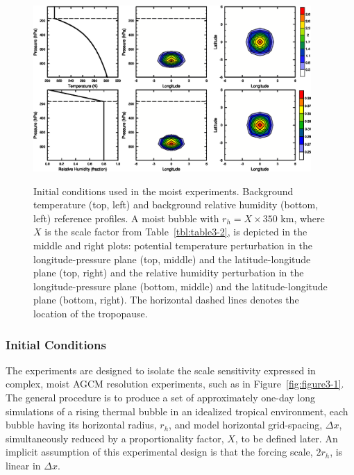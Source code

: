 \begin{figure}
\begin{center}
\noindent\includegraphics[width=25pc,angle=0]{chapter3/Figure2.eps}\\
\end{center}
\caption{Initial conditions used in the moist experiments. Background temperature (top, left) and background relative humidity (bottom, left) reference profiles.  A moist bubble with $r_h = X \times 350$ km, where $X$ is the scale factor from Table~\ref{tbl:table3-2}, is depicted in the middle and right plots: potential temperature perturbation in the longitude-pressure plane (top, middle) and the latitude-longitude plane (top, right) and the relative humidity perturbation in the longitude-pressure plane (bottom, middle) and the latitude-longitude plane (bottom, right). The horizontal dashed lines denotes the location of the tropopause.}
\label{fig:figure3-2}
\end{figure}

\subsubsection*{Initial Conditions}
The experiments are designed to isolate the scale sensitivity expressed in complex, moist AGCM resolution experiments, such as in Figure~\ref{fig:figure3-1}. The general procedure is to produce a set of approximately one-day long simulations of a rising thermal bubble in an idealized tropical environment, each bubble having its horizontal radius, $r_h$, and model horizontal grid-spacing, $\Delta x$, simultaneously reduced by a proportionality factor, $X$, to be defined later. An implicit assumption of this experimental design is that the forcing scale, $2 r_h$, is linear in $\Delta x$. 

